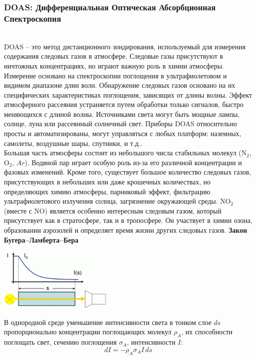 \documentclass[a4paper,14pt]{article}
\theoremstyle{plain}
\theoremstyle{definition}
\theoremstyle{remark}
\newcommand{\nl}{\\ \indent}
\newcommand{\no}{$\text{NO}_2 \;$}
\begin{document}
\subsubsection{DOAS: Дифференциальная Оптическая Абсорбционная Спектроскопия}
\noindent
\nl
DOAS -- это метод дистанционного зондирования, используемый для
измерения содержания следовых газов в атмосфере. 
Следовые газы присутствуют в ничтожных концентрациях, 
но играют важную роль в химии атмосферы.
Измерение основано на спектроскопии поглощения в ультрафиолетовом
и видимом диапазоне длин волн.
Обнаружение следовых газов основано на их специфических
характеристиках поглощения, зависящих от длины волны.
Эффект атмосферного рассеяния устраняется путем обработки 
только сигналов, быстро меняющихся с длиной волны.
Источниками света могут быть мощные лампы, солнце, луна 
или рассеянный солнечный свет.
Приборы DOAS относительно просты и автоматизированы, 
могут управляться с любых платформ: наземных, 
самолеты, воздушные шары, спутники, и т.д..
\nl
Большая часть атмосферы состоит из небольшого числа стабильных
молекул ($\text{N}_2$, $\text{O}_2$, $Ar$). 
Водяной пар играет особую роль из-за его различной концентрации 
и фазовых изменений. 
Кроме того, существует большое количество следовых газов,
присутствующих в небольших или даже крошечных количествах, 
но определяющих химию атмосферы, парниковый эффект, 
фильтрацию ультрафиолетового излучения солнца, загрязнение
окружающей среды. 
\no (вместе с $\text{NO}$) является особенно интересным следовым
газом, который присутствует как в стратосфере, так и в
тропосфере. 
Он участвует в химии озона, образовании аэрозолей и определяет
время жизни других следовых газов. 
\textbf{Закон Бугера--Ламберта--Бера}
\begin{floatingfigure}{55mm}
\noindent
\hfil
\includegraphics[width=55mm]{pic/lambert.png}
\hfil
\end{floatingfigure}
В однородной среде уменьшение интенсивности света в тонком слое
$ds$ пропорционально концентрации поглощающих молекул $\rho_{A}$,
их способности поглощать свет, сечению поглощения $\sigma_{A}$,
интенсивности $I$:
\begin{equation}
dI = - \rho_{A} \sigma_{A} I \, ds
\label{eq_Lambert}
\end{equation}
\end{document}
